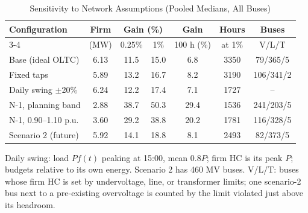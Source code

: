 \begin{table}[t]
\centering
\caption{Sensitivity to Network Assumptions (Pooled Medians, All Buses)}
\label{tab:sens}
\setlength{\tabcolsep}{2.4pt}
\begin{tabular}{lcccccc}
\toprule
Configuration & Firm & \multicolumn{2}{c}{Gain (\%)} & Gain & Hours & Buses \\
\cmidrule(lr){3-4}
 & (MW) & 0.25\% & 1\% & 100 h (\%) & at 1\% & V/L/T \\
\midrule
Base (ideal OLTC) & 6.13 & 11.5 & 15.0 & 6.8 & 3350 & 79/365/5 \\
Fixed taps & 5.89 & 13.2 & 16.7 & 8.2 & 3190 & 106/341/2 \\
Daily swing $\pm$20\% & 6.24 & 12.2 & 17.4 & 7.1 & 1727 & -- \\
N-1, planning band & 2.88 & 38.7 & 50.3 & 29.4 & 1536 & 241/203/5 \\
N-1, 0.90--1.10 p.u. & 3.60 & 29.2 & 38.8 & 20.2 & 1781 & 116/328/5 \\
Scenario 2 (future) & 5.92 & 14.1 & 18.8 & 8.1 & 2493 & 82/373/5 \\
\bottomrule
\end{tabular}
\vspace{2pt}
\begin{minipage}{\columnwidth}\footnotesize Daily swing: load $Pf(t)$ peaking at 15:00, mean $0.8P$; firm HC is its peak $P$; budgets relative to its own energy. Scenario 2 has 460 MV buses. V/L/T: buses whose firm HC is set by undervoltage, line, or transformer limits; one scenario-2 bus next to a pre-existing overvoltage is counted by the limit violated just above its headroom.\end{minipage}
\end{table}
